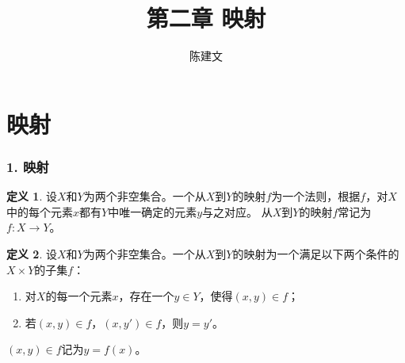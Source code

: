 \documentclass{beamer}
\begin{document}
\begin{CJK*}{UTF8}{gbsn}

\newtheorem{Thm}{定理}[section]
\newtheorem{Cor}{推论}[section]
\theoremstyle{definition}
\newtheorem{Def}{定义}[section]
\theoremstyle{example}
\newtheorem*{Ex}{例：}
\newtheorem{Exercise}{习题}

\date{}
\author{陈建文}

\title{第二章 映射}
\begin{frame}
  \titlepage
\end{frame}  
\section{映射}
\begin{frame}
  \frametitle{1. 映射}
  
  \begin{Def}
    设$X$和$Y$为两个非空集合。一个从$X$到$Y$的\alert{映射}$f$为一个法则，根据$f$，对$X$中的每个元素$x$都有$Y$中唯一确定的元素$y$与之对应。
    从$X$到$Y$的映射$f$常记为$f:X\to Y$。
  \end{Def}\pause

  \begin{Def}
    设$X$和$Y$为两个非空集合。一个从$X$到$Y$的映射为一个满足以下两个条件的$X\times Y$的子集$f$：
    \begin{enumerate}
    \item 对$X$的每一个元素$x$，存在一个$y\in Y$，使得$(x,y) \in f$；
    \item 若$(x,y)\in f$，$(x,y')\in f$，则$y=y'$。
    \end{enumerate}
    $(x,y)\in f$记为$y=f(x)$。
  \end{Def}\pause


\end{frame}
\end{CJK*}
\end{document}
